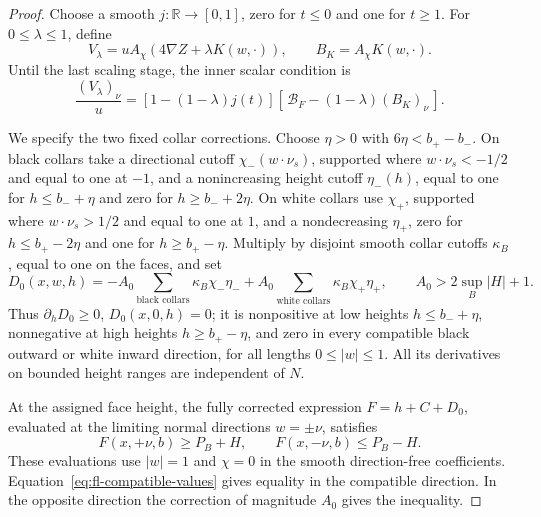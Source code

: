 \begin{proof}
Choose a smooth \(j:\mathbb R\to[0,1]\), zero for \(t\le0\) and one
for \(t\ge1\).  For \(0\le\lambda\le1\), define
\[
 V_\lambda=uA_\chi(4\nabla Z+\lambda K(w,\cdot)),\qquad
 B_K=A_\chi K(w,\cdot).
\]
Until the last scaling stage, the inner scalar condition is
\begin{equation}
\label{eq:fl-homotopy-one}
 \frac{(V_\lambda)_\nu}{u}
  =[1-(1-\lambda)j(t)]
       [\,\mathcal B_F-(1-\lambda)(B_K)_\nu\,].
\end{equation}

We specify the two fixed collar corrections.  Choose
\(\eta>0\) with \(6\eta<b_+-b_-\).  On black collars take a
directional cutoff \(\chi_-(w\cdot\nu_s)\), supported where
\(w\cdot\nu_s<-1/2\) and equal to one at \(-1\), and a nonincreasing
height cutoff \(\eta_-(h)\), equal to one for
\(h\le b_-+\eta\) and zero for \(h\ge b_-+2\eta\).
On white collars use \(\chi_+\), supported where
\(w\cdot\nu_s>1/2\) and equal to one at \(1\), and a nondecreasing
\(\eta_+\), zero for \(h\le b_+-2\eta\) and one for
\(h\ge b_+-\eta\).  Multiply by disjoint smooth collar cutoffs
\(\kappa_B\), equal to one on the faces, and set
\[
 D_0(x,w,h)=
 -A_0\sum_{\text{black collars}}\kappa_B\chi_-\eta_-
 +A_0\sum_{\text{white collars}}\kappa_B\chi_+\eta_+,
 \qquad A_0>2\sup_B\lvert H\rvert+1 .
\]
Thus \(\partial_hD_0\ge0\), \(D_0(x,0,h)=0\);
it is nonpositive at low heights \(h\le b_-+\eta\), nonnegative
at high heights \(h\ge b_+-\eta\), and zero in every compatible
black outward or white inward direction, for all lengths
\(0\le\lvert w\rvert\le1\).  All its derivatives on bounded height
ranges are independent of \(N\).

At the assigned face height, the fully corrected expression
\(F=h+C+D_0\), evaluated at the limiting normal directions
\(w=\pm\nu\), satisfies
\begin{equation}
\label{eq:fl-directional-inequalities}
 F(x,+\nu,b)\ge P_B+H,\qquad
 F(x,-\nu,b)\le P_B-H .
\end{equation}
These evaluations use \(\lvert w\rvert=1\) and \(\chi=0\) in the
smooth direction-free coefficients.  Equation~\eqref{eq:fl-compatible-values}
gives equality in the compatible direction.  In the opposite
direction the correction of magnitude \(A_0\) gives the inequality.


\end{proof}
